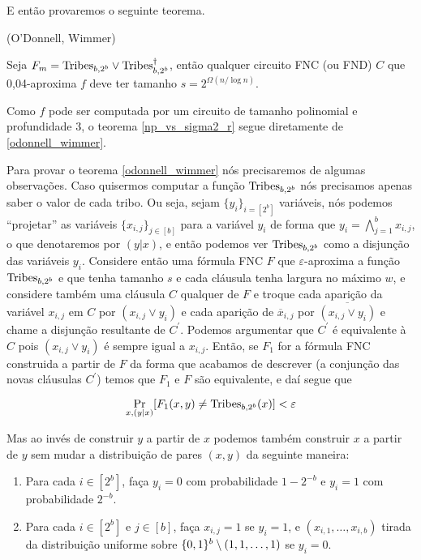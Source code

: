 E então provaremos o seguinte teorema.

\begin{teo} (O'Donnell, Wimmer) \label{odonnell_wimmer}

Seja $F_{m} = \text{Tribes}_{b, 2^{b}} \lor \text{Tribes}_{b, 2^{b}}^{\dagger}$, então qualquer circuito FNC (ou FND) $C$ que  0,04-aproxima $f$ deve ter tamanho $s = 2^{\Omega(n/\log n)}$.

\end{teo}

Como $f$ pode ser computada por um circuito de tamanho polinomial e profundidade 3, o teorema \ref{np_vs_sigma2_r} segue diretamente de \ref{odonnell_wimmer}.

Para provar o teorema \ref{odonnell_wimmer} nós precisaremos de algumas observações. Caso quisermos computar a função $\text{Tribes}_{b, 2^{b}}$ nós precisamos apenas saber o valor de cada tribo. Ou seja, sejam $\{y_{i}\}_{i = [2^{b}]}$ variáveis, nós podemos ``projetar'' as variáveis $\{x_{i, j}\}_{j \in [b]}$ para a variável $y_{i}$ de forma que $y_{i} = \bigwedge_{j = 1}^{b} x_{i, j}$, o que denotaremos por $(y \lvert x)$, e então podemos ver $\text{Tribes}_{b, 2^{b}}$ como a disjunção das variáveis $y_{i}$. Considere então uma fórmula FNC $F$ que $\varepsilon$-aproxima a função $\text{Tribes}_{b, 2^{b}}$ e que tenha tamanho $s$ e cada cláusula tenha largura no máximo $w$, e considere também uma cláusula $C$ qualquer de $F$ e troque cada aparição da variável $x_{i, j}$ em $C$ por $(x_{i, j} \lor y_{i})$ e cada aparição de $\overline{x}_{i, j}$ por $\overline{(x_{i, j} \lor y_{i})}$ e chame a disjunção resultante de $C^{\prime}$. Podemos argumentar que $C^{\prime}$ é equivalente à $C$ pois $(x_{i, j} \lor y_{i})$ é sempre igual a $x_{i, j}$. Então, se $F_{1}$ for a fórmula FNC construida a partir de $F$ da forma que acabamos de descrever (a conjunção das novas cláusulas $C^{\prime}$) temos que $F_{1}$ e $F$ são equivalente, e daí segue que

\begin{equation*}
	\Pr_{x, (y \lvert x)}[F_{1}(x, y) \neq \text{Tribes}_{b, 2^{b}}(x)] < \varepsilon
\end{equation*}

Mas ao invés de construir $y$ a partir de $x$ podemos também construir $x$ a partir de $y$ sem mudar a distribuição de pares $(x, y)$ da seguinte maneira:

\begin{enumerate}

	\item Para cada $i \in [2^{b}]$, faça $y_{i} = 0$ com probabilidade $1 - 2^{-b}$ e $y_{i} = 1$ com probabilidade $2^{-b}$.
	
	\item Para cada $i \in [2^{b}]$ e $j \in [b]$, faça $x_{i, j} = 1$ se $y_{i} = 1$, e $(x_{i, 1}, \dots, x_{i, b})$ tirada da distribuição uniforme sobre $\{0, 1\}^{b} \setminus (1, 1, \dots, 1)$ se $y_{i} = 0$. 

\end{enumerate}

